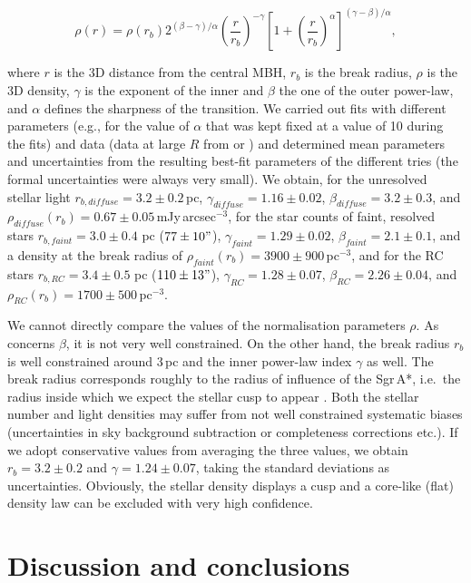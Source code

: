 \documentclass[a4paper]{jpconf}
\begin{document}
\begin{equation}
\rho(r) = \rho(r_{b})2^{(\beta-\gamma)/\alpha}\left(\frac{r}{r_{b}}\right)^{-\gamma}\left[1+\left(\frac{r}{r_{b}}\right)^{\alpha}\right]^{(\gamma-\beta)/\alpha},
\end{equation}

where $r$ is the 3D distance from the central MBH, $r_{b}$ is the
break radius, $\rho$ is the 3D density, $\gamma$ is the exponent of
the inner and $\beta$ the one of the outer power-law, and $\alpha$
defines the sharpness of the transition.  We carried out fits with
different parameters (e.g., for the value of $\alpha$ that was kept
fixed at a value of 10 during the fits) and data (data at large $R$ from
\cite{Schodel:2014fk} or \cite{Fritz:2016fj}) and determined mean
parameters and uncertainties from the resulting best-fit parameters of
the different tries (the formal uncertainties were always very
small). We obtain, for the unresolved stellar light
$r_{b,diffuse} = 3.2\pm0.2$\,pc, $\gamma_{diffuse}=1.16\pm0.02$,
$\beta_{diffuse}=3.2\pm0.3$, and
$\rho_{diffuse} (r_{b})=0.67\pm0.05$\,mJy\,arcsec$^{-3}$, for the star
counts of faint, resolved stars $r_{b,faint}=3.0 \pm 0.4$ pc
($77 \pm 10"$), $\gamma_{faint} = 1.29 \pm 0.02$,
$\beta_{faint} = 2.1 \pm 0.1$, and a density at the break radius of
$\rho_{faint} (r_{b})=3900 \pm 900$\,pc$^{-3}$, and for the RC stars
$r_{b,RC}=3.4 \pm 0.5$ pc ($110 \pm 13"$),
$\gamma_{RC} = 1.28 \pm 0.07$, $\beta_{RC} = 2.26 \pm 0.04$, and
$\rho_{RC} (r_{b})=1700 \pm 500$\,pc$^{-3}$.

We cannot directly compare the values of the normalisation parameters
$\rho$. As concerns $\beta$, it is not very well constrained. On the
other hand, the break radius $r_{b}$ is well constrained around 3\,pc
and the inner power-law index $\gamma$ as well. The break radius
corresponds roughly to the radius of influence of the Sgr\,A*, i.e.\ the
radius inside which we expect the stellar cusp to appear
\cite{Alexander:2005fk}. Both the stellar number and light densities
may suffer from not well constrained systematic biases (uncertainties
in sky background subtraction or completeness corrections etc.). If we
adopt conservative values from averaging the three values, we obtain
$r_{b}=3.2\pm0.2$ and $\gamma=1.24\pm0.07$, taking the standard
deviations as uncertainties. Obviously, the stellar density displays a
cusp and a core-like (flat) density law can be excluded with very high
confidence.



\section{Discussion and conclusions}
\end{document}
